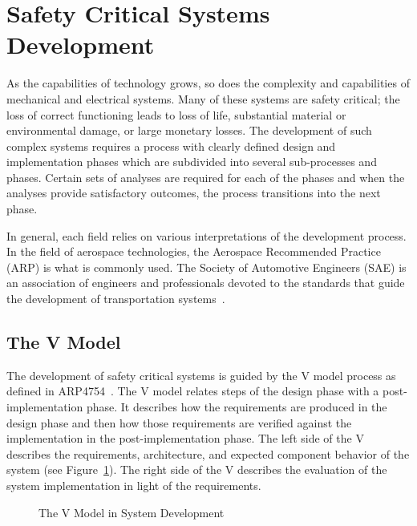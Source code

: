 \section{Safety Critical Systems Development}
\label{sec:criticalSysDev}
As the capabilities of technology grows, so does the complexity and capabilities of mechanical and electrical systems. Many of these systems are safety critical; the loss of correct functioning leads to loss of life, substantial material or environmental damage, or large monetary losses. The development of such complex systems requires a process with clearly defined design and implementation phases which are subdivided into several sub-processes and phases. Certain sets of analyses are required for each of the phases and when the analyses provide satisfactory outcomes, the process transitions into the next phase. 

In general, each field relies on various interpretations of the development process. In the field of aerospace technologies, the Aerospace Recommended Practice (ARP) is what is commonly used. The Society of Automotive Engineers (SAE) is an association of engineers and professionals devoted to the standards that guide the development of transportation systems~\cite{SAE:ARP4761, SAE:ARP4754A}. 

\subsection{The V Model}
The development of safety critical systems is guided by the V model process as defined in ARP4754~\cite{SAE:ARP4754A}. The V model relates steps of the design phase with a post-implementation phase. It describes how the requirements are produced in the design phase and then how those requirements are verified against the implementation in the post-implementation phase. The left side of the V describes the requirements, architecture, and expected component behavior of the system (see Figure~\ref{fig:v1}). The right side of the V describes the evaluation of the system implementation in light of the requirements. 

\begin{figure}[!htb]
        \caption{\label{fig:v1} The V Model in System Development}
\end{figure}

